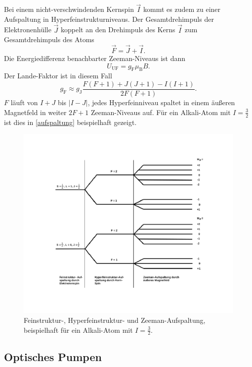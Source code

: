 Bei einem nicht-verschwindenden Kernspin $\vec{I}$ kommt es zudem zu einer Aufspaltung in Hyperfeinstrukturniveaus.
Der Gesamtdrehimpuls der Elektronenhülle $\vec{J}$ koppelt an den Drehimpuls des Kerns $\vec{I}$ zum Gesamtdrehimpuls des Atoms
\begin{equation}
  \vec{F} = \vec{J} + \vec{I}.
\end{equation}
Die Energiedifferenz benachbarter Zeeman-Niveaus ist dann
\begin{equation}
  U_\text{UF} = g_\text{F}\mu_\text{B}B.
\end{equation}
Der Lande-Faktor ist in diesem Fall
\begin{equation}
  g_\text{F} \approx g_\text{J}\frac{F(F+1)+J(J+1)-I(I+1)}{2F(F+1)}.
\end{equation}
$F$ läuft von $I+J$ bis $|I-J|$, jedes Hyperfeinniveau spaltet in einem äußeren Magnetfeld in weiter $2F+1$ Zeeman-Niveaus
auf. Für ein Alkali-Atom mit $I=\frac{3}{2}$ ist dies in \autoref{aufspaltung} beispielhaft gezeigt.
\begin{figure}
  \centering
  \includegraphics[width=\textwidth]{img/aufspaltung.pdf}
  \caption{Feinstruktur-, Hyperfeinstruktur- und Zeeman-Aufspaltung, beispielhaft für ein Alkali-Atom mit
  $I=\frac{3}{2}$\cite{FP}.}
  \label{aufspaltung}
\end{figure}

\subsection{Optisches Pumpen}

